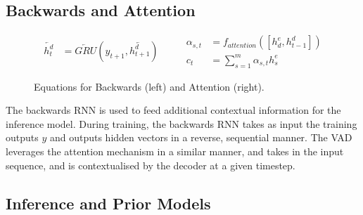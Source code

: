 \documentclass[12pt,twoside]{report}
\begin{document}
\subsection{Backwards and Attention}


\begin{figure}[!ht]
	\label{eqn:eqback}
	\begin{equation}
		\begin{split}
			\overleftarrow{h^d_t} &= \overleftarrow{GRU}(y_{t+1}, \overleftarrow{h^d_{t+1}})
		\end{split}
		\quad\quad
		\begin{split}
			\alpha_{s,t} &= f_{attention}([h^e_d, h^d_{t-1}]) \\
			c_t &= \sum^m_{s=1}\alpha_{s,t} h^e_s
		\end{split}
	\end{equation}
	\caption{Equations for Backwards (left) and Attention (right).}
	\end{figure}


The backwards RNN is used to feed additional contextual information for the inference model.  During training, the backwards RNN takes as input the training outputs $y$ and outputs hidden vectors in a reverse, sequential manner. The VAD leverages the attention mechanism in a similar manner, and takes in the input sequence, and is contextualised by the decoder at a given timestep.

\subsection{Inference and Prior Models}
\end{document}
